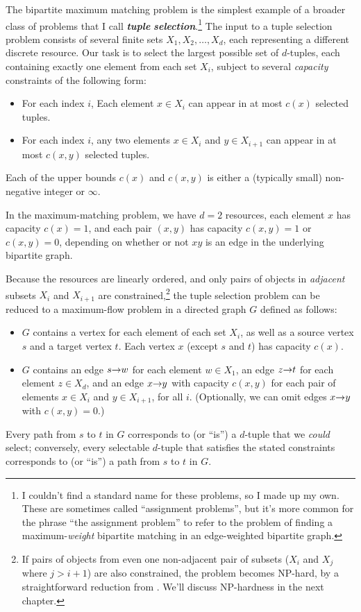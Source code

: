 The bipartite maximum matching problem is the simplest example of a broader class of problems that I call \textbf{\textit{tuple}} \textbf{\textit{selection}}.\footnote{I couldn’t find a standard name for these problems, so I made up my own. These are sometimes called “assignment problems”, but it’s more common for the phrase “the assignment problem” to refer to the problem of finding a maximum-\textit{weight} bipartite matching in an edge-weighted bipartite graph.}
The input to a tuple selection problem consists of several finite sets $X_1, X_2, \dots, X_d$, each representing a different discrete resource.
Our task is to select the largest possible set of $d$-tuples, each containing exactly one element from each set $X_i$, subject to several \textit{capacity} constraints of the following form:
\begin{itemize}
\item For each index $i$, Each element $x \in X_i$ can appear in at most $c(x)$ selected tuples.
\item For each index $i$, any two elements $x \in X_i$ and $y \in X_{i+1}$ can appear in at most $c(x,y)$ selected tuples.
\end{itemize}
\noindent Each of the upper bounds $c(x)$ and $c(x,y)$ is either a (typically small) non-negative integer or $\infty$.

In the maximum-matching problem, we have $d = 2$ resources, each element $x$ has capacity $c(x) = 1$, and each pair $(x,y)$ has capacity $c(x,y) = 1$ or $c(x,y) = 0$, depending on whether or not $xy$ is an edge in the underlying bipartite graph.

Because the resources are linearly ordered, and only pairs of objects in \textit{adjacent} subsets $X_i$ and $X_{i+1}$ are constrained,\footnote{If pairs of objects from even one non-adjacent pair of subsets ($X_i$ and $X_j$ where $j > i + 1$) are also constrained, the problem becomes NP-hard, by a straightforward reduction from . We’ll discuss NP-hardness in the next chapter.} the tuple selection problem can be reduced to a maximum-flow problem in a directed graph $G$ defined as follows:
\begin{itemize}
\item $G$ contains a vertex for each element of each set $X_i$, as well as a source vertex $s$ and a target vertex $t$. Each vertex $x$ (except $s$ and $t$) has capacity $c(x)$.
\item $G$ contains an edge $s\mathord{\rightarrow}w$ for each element $w \in X_1$, an edge $z\mathord{\rightarrow}t$ for each element $z \in X_d$, and an edge $x\mathord{\rightarrow}y$ with capacity $c(x,y)$ for each pair of elements $x \in X_i$ and $y \in X_{i+1}$, for all $i$. (Optionally, we can omit edges $x\mathord{\rightarrow}y$ with $c(x,y) = 0$.)
\end{itemize}
\noindent Every path from $s$ to $t$ in $G$ corresponds to (or “is”) a $d$-tuple that we \textit{could} select; conversely, every selectable $d$-tuple that satisfies the stated constraints corresponds to (or “is”) a path from $s$ to $t$ in $G$.

